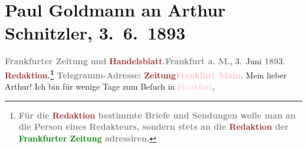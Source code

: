 

               \section[Paul Goldmann an Arthur Schnitzler, 3. 6. 1893]{ Paul Goldmann an Arthur Schnitzler, 3. 6. 1893}\nopagebreak{}\rehead{ }\normalsize\beginnumbering{} \toendnotes[C]{\smallbreak\pagebreak[2]} 
\toendnotes[C]{\smallbreak}\pstart
           \noindent{}{\pb}\textcolor{brown}{\textcolor{gray}{\textbf{\textbf{Frankfurter Zeitung}}}}{}\ledrightnote{\textcolor{brown}{Frankfurter Zeitung}}\pend
           \pstart
           \textcolor{gray}{\textbf{und}}\pend
           \pstart
           \textcolor{gray}{\textbf{\textcolor{brown}{\textbf{Handelsblatt}}{}.}}\hfill \textcolor{pink}{\textcolor{gray}{\textbf{Frankfurt a. M.}}}{}\ledrightnote{\textcolor{pink}{Frankfurt am Main}}, 3. Juni \textcolor{gray}{\textbf{189}}3.
                  \pend
           \pstart
           \textcolor{gray}{\textbf{\textcolor{brown}{\textbf{Redaktion.}}{}\footnote{\noindent{}\textcolor{gray}{\textbf{Für die \textcolor{brown}{Redaktion} bestimmte Briefe und Sendungen wolle
                              man  an die Person eines Redakteurs,
                              sondern stets \textbf{an die \textcolor{brown}{Redaktion} der \textcolor{green}{Frankfurter Zeitung}} adressiren.}}}}}\pend
           \pstart
           \textcolor{gray}{\textbf{\textbf{Telegramm-Adresse:}}}\pend
           \pstart
           \textcolor{gray}{\textbf{\textbf{\textcolor{brown}{Zeitung}{}\textcolor{pink}{Frankfurt Main}{}\ledrightnote{\textcolor{pink}{Frankfurt am Main}}.}}}\pend
           \pstart\center{}Mein lieber Arthur!\pend\pstart
           Ich bin für wenige Tage zum Beſuch in \textcolor{pink}{Frankfurt}{}\ledrightnote{\textcolor{pink}{Frankfurt am Main}},
